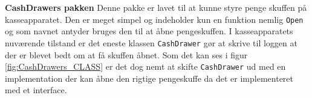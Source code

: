 \textbf{CashDrawers pakken}
\newline
Denne pakke er lavet til at kunne styre penge skuffen på kasseapparatet. Den er meget simpel og indeholder kun en funktion nemlig \texttt{Open} og som navnet antyder bruges den til at åbne pengeskuffen.
I kasseapparatets nuværende tilstand er det eneste klassen \texttt{CashDrawer} gør at skrive til loggen at der er blevet bedt om at få skuffen åbnet.
Som det kan ses i figur \ref{fig:CashDrawers_CLASS} er det dog nemt at skifte \texttt{CashDrawer} ud med en implementation der kan åbne den rigtige pengeskuffe da det er implementeret med et interface.

